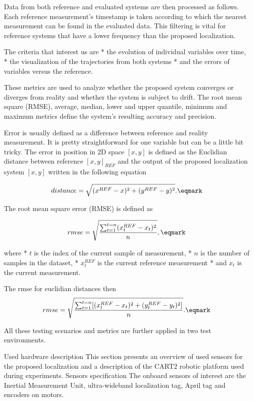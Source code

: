 Data from both reference and evaluated systems are then processed as follows. Each reference measurement's timestamp is taken according to which the nearest measurement can be found in the evaluated data. This filtering is vital for reference systems that have a lower frequency than the proposed localization.

The criteria that interest us are
\begitems
* the evolution of individual variables over time,
* the visualization of the trajectories from both systems
* and the errors of variables versus the reference.
\enditems

These metrics are used to analyze whether the proposed system converges or diverges from reality and whether the system is subject to drift. The root mean square (RMSE), average, median, lower and upper quantile, minimum and maximum metrics define the system's resulting accuracy and precision.

Error is usually defined as a difference between reference and reality measurement. It is pretty straightforward for one variable but can be a little bit tricky. The error in position in 2D space $[x, y]$ is defined as the Euclidian distance between reference $[x, y]_{REF}$ and the output of the proposed localization system $[x, y]$ written in the following equation

$$	distance = \sqrt{(x^{REF}-x)^2 + (y^{REF}-y)^2}. \eqmark$$

The root mean square error (RMSE) is defined as

$$	rmse = \sqrt{{\sum_{t=1}^{t=n}(x_t^{REF} - x_t)^2} \over {n}}, \eqmark$$

where
\begitems
* $t$ is the index of the current sample of measurement,
* $n$ is the number of samples in the dataset,
* $x_t^{REF}$ is the current reference measurement
* and $x_t$ is the current measurement.
\enditems

The rmse for euclidian distances then
$$	rmse = \sqrt{{\sum_{t=1}^{t=n}[(x_t^{REF} - x_t)^2 + (y_t^{REF} - y_t)^2]} \over {n}}. \eqmark$$

All these testing scenarios and metrics are further applied in two test environments.

\sec Used hardware description
This section presents an overview of used sensors for the proposed localization and a description of the CART2 robotic platform used during experiments.
\secc Sensors specification
The onboard sensors of interest are the Inertial Measurement Unit, ultra-wideband localization tag, April tag and encoders on motors.

